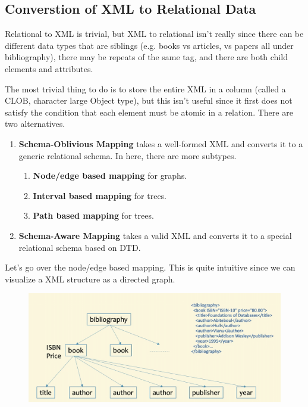 \documentclass{article}
\begin{document}
  \subsection{Converstion of XML to Relational Data} 
    
    Relational to XML is trivial, but XML to relational isn't really since there can be different data types that are siblings (e.g. books vs articles, vs papers all under bibliography), there may be repeats of the same tag, and there are both child elements and attributes. 
    
    The most trivial thing to do is to store the entire XML in a column (called a CLOB, character large Object type), but this isn't useful since it first does not satisfy the condition that each element must be atomic in a relation. There are two alternatives. 
    \begin{enumerate}
      \item \textbf{Schema-Oblivious Mapping} takes a well-formed XML and converts it to a generic relational schema. In here, there are more subtypes. 
        \begin{enumerate}
          \item \textbf{Node/edge based mapping} for graphs. 
          \item \textbf{Interval based mapping} for trees.
          \item \textbf{Path based mapping} for trees. 
        \end{enumerate}
      \item \textbf{Schema-Aware Mapping} takes a valid XML and converts it to a special relational schema based on DTD. 
    \end{enumerate} 

    Let's go over the node/edge based mapping. This is quite intuitive since we can visualize a XML structure as a directed graph. 
    \begin{figure}[H]
      \centering 
      \includegraphics[scale=0.25]{img/node_based.png}
      \caption{} 
      \label{fig:node_based}
    \end{figure}
\end{document}

